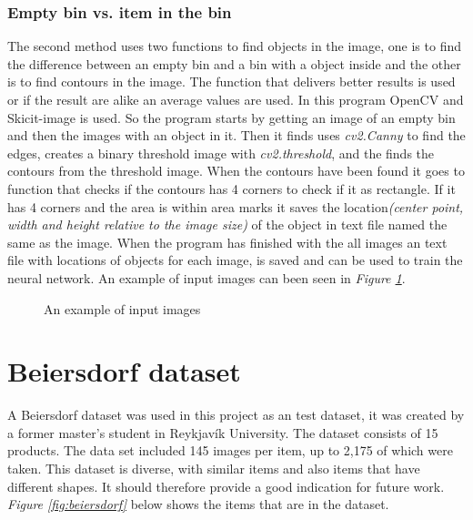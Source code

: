 \subsubsection*{Empty bin vs. item in the bin}\label{emptyvsitem}
The second method uses two functions to find objects in the image, one is to find the difference between an empty bin and a bin with a object inside and the other is to find contours in the image. 
The function that delivers better results is used or if the result are alike an average values are used. 
In this program OpenCV and Skicit-image is used. 
So the program starts by getting an image of an empty bin and then the images with an object in it. 
Then it finds uses \textit{cv2.Canny} to find the edges, creates a binary threshold image with \textit{cv2.threshold}, and the finds the contours from the threshold image.  
When the contours have been found it goes to function that checks if the contours has 4 corners to check if it as rectangle. 
If it has 4 corners and the area is within area marks it saves the location\textit{(center point, width and height relative to the image size)} of the object in text file named the same as the image. 
When the program has finished with the all images an text file with locations of objects for each image, is saved and can be used to train the neural network. An example of input images can been seen in \textit{Figure \ref{figure: emptyafter}}.
\begin{figure}[h]
    \centering
    \hfill
    \caption{An example of input images}
    \label{figure: emptyafter}
\end{figure}
\clearpage
\section{Beiersdorf dataset}
A Beiersdorf dataset\cite{bjarnason_1984-_detecting_2021} was used in this project as an test dataset, it was created by a former master's student in Reykjavík University. 
The dataset consists of 15 products. The data set included 145 images per item, up to 2,175 of which were taken. This dataset is diverse, with similar items and also items that have different shapes. It should therefore provide a good indication for future work. \textit{Figure \ref{fig:beiersdorf}} below shows the items that are in the dataset.

